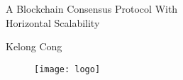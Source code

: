 \begin{titlepage}

\null\vfill

\begin{center}
\LARGE{A Blockchain Consensus Protocol With\\Horizontal Scalability}
\end{center}

\vspace{1.5cm}

\begin{center}
Kelong Cong
\end{center}

\vfill

\begin{figure}[!b]
\centering
\texttt{[image: logo]}
\end{figure}

\vspace{2.0cm}

\end{titlepage}

